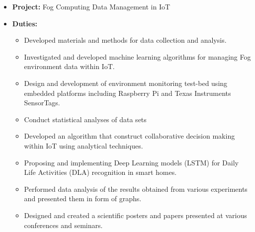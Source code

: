 \documentclass[10pt,a4paper,ragged2e]{altacv}
\begin{document}
\newline



\begin{itemize}
\item \textbf{Project:} Fog Computing Data Management in IoT 
\item \textbf{Duties:}
\begin{itemize}
    \item Developed materials and methods for data collection and analysis.
    \item Investigated and developed machine learning algorithms for managing Fog environment data within IoT.
    \item Design and development of environment monitoring test-bed using embedded platforms including Raspberry Pi and Texas Instruments SensorTags.
    \item Conduct statistical analyses of data sets
    \item Developed an algorithm that construct collaborative decision making within IoT using analytical techniques.
    \item Proposing and implementing Deep Learning models (LSTM) for Daily Life Activities (DLA) recognition in smart homes.
    \item Performed data analysis of the results obtained from various experiments and presented them in form of graphs.
    \item Designed and created a scientific posters and papers presented at various conferences and seminars.
    
\end{itemize}


\end{itemize}
\divider
\end{document}
